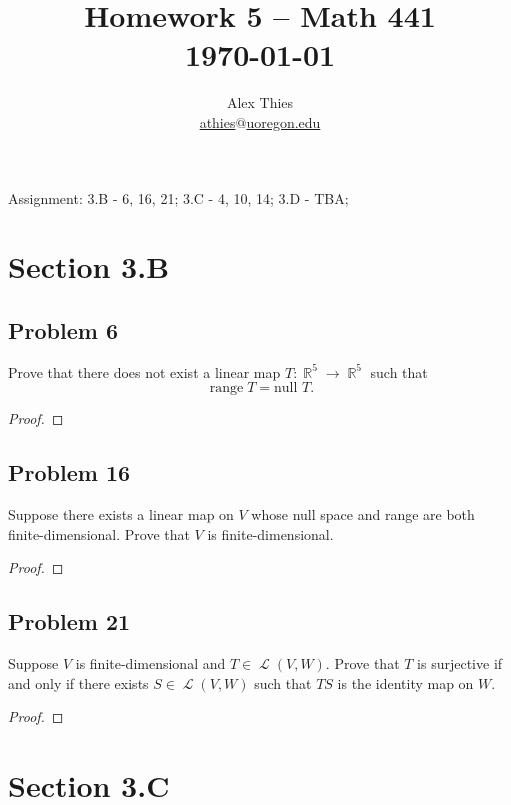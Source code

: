 \documentclass[letterpaper, 12pt]{amsart}
\DeclareMathOperator{\R}{\mathbb{R}}
\renewcommand{\null}{\text{null }}
\DeclareMathOperator{\range}{\text{range }}
\DeclareMathOperator{\Ell}{\mathscr{L}}
\theoremstyle{definition}  %
\begin{document}
	\title{Homework 5  -- Math 441 \\ \today}
	\author{Alex Thies \\ \href{mailto:athies@uoregon.edu}{\lowercase{athies$@$uoregon.edu}}}

	\maketitle

	Assignment: 3.B - 6, 16, 21; 3.C - 4, 10, 14; 3.D - TBA;

	\section*{Section 3.B}
		\subsection*{Problem 6}
		Prove that there does not exist a linear map $T : \R^{5} \to \R^{5}$ such that $$\range T = \null T.$$

		\begin{proof}
		\end{proof}

		\subsection*{Problem 16}
		Suppose there exists a linear map on $V$ whose null space and range are both finite-dimensional. 
		Prove that $V$ is finite-dimensional.

		\begin{proof}
		\end{proof}

		\subsection*{Problem 21}
		Suppose $V$ is finite-dimensional and $T \in \Ell(V,W)$. 
		Prove that $T$ is surjective if and only if there exists $S \in \Ell(V,W)$ such that $TS$ is the identity map on $W$.

		\begin{proof}
		\end{proof}

	\section*{Section 3.C}
\end{document}
